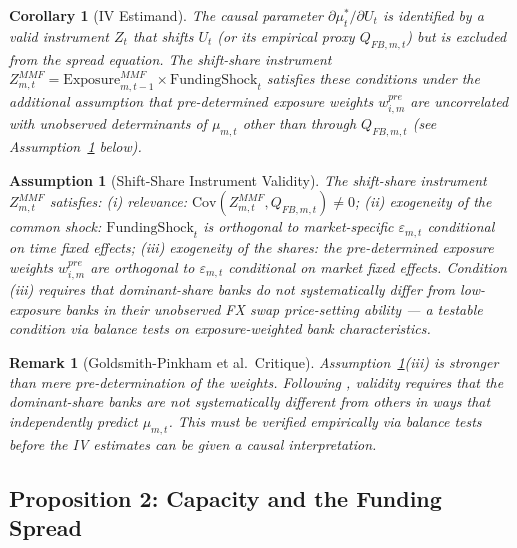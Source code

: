 \documentclass[12pt]{article}
\newtheorem{corollary}{Corollary}[proposition]
\newtheorem{assumption}{Assumption}
\newtheorem{remark}{Remark}
\theoremstyle{definition}
\newcommand{\1}[1]{\mathds{1}\left[#1\right]}
\begin{document}
\begin{corollary}[IV Estimand]
  \label{cor:IV}
  The causal parameter $\partial\mu_t^*/\partial U_t$ is identified by a valid
  instrument $Z_t$ that shifts $U_t$ (or its empirical proxy $Q_{FB,m,t}$) but
  is excluded from the spread equation. The shift-share instrument
  $Z^{MMF}_{m,t} = \mathrm{Exposure}^{MMF}_{m,t-1} \times \mathrm{FundingShock}_t$
  satisfies these conditions under the additional assumption that pre-determined
  exposure weights $w_{i,m}^{pre}$ are uncorrelated with unobserved determinants
  of $\mu_{m,t}$ other than through $Q_{FB,m,t}$ (see
  Assumption~\ref{ass:instrument} below).
\end{corollary}

\begin{assumption}[Shift-Share Instrument Validity]
  \label{ass:instrument}
  The shift-share instrument $Z^{MMF}_{m,t}$ satisfies: (i) relevance:
  $\mathrm{Cov}(Z^{MMF}_{m,t}, Q_{FB,m,t}) \neq 0$; (ii) exogeneity of the
  common shock: $\mathrm{FundingShock}_t$ is orthogonal to market-specific
  $\varepsilon_{m,t}$ conditional on time fixed effects; (iii) exogeneity of
  the shares: the pre-determined exposure weights $w_{i,m}^{pre}$ are
  orthogonal to $\varepsilon_{m,t}$ conditional on market fixed effects.
  Condition (iii) requires that dominant-share banks do not systematically
  differ from low-exposure banks in their unobserved FX swap price-setting
  ability --- a testable condition via balance tests on exposure-weighted bank
  characteristics.
\end{assumption}

\begin{remark}[Goldsmith-Pinkham et al.\ Critique]
  Assumption~\ref{ass:instrument}(iii) is stronger than mere pre-determination
  of the weights. Following \citet{GoldsmithPinkham2020}, validity requires
  that the dominant-share banks are not systematically different from others in
  ways that independently predict $\mu_{m,t}$. This must be verified empirically
  via balance tests before the IV estimates can be given a causal interpretation.
\end{remark}

\subsection{Proposition 2: Capacity and the Funding Spread}
\end{document}
